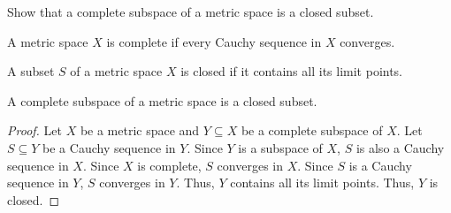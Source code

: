 \begin{problem}
  Show that a complete subspace of a metric space is a closed subset.
\end{problem}
\begin{answer}
  \begin{definition}
    A metric space $X$ is complete if every Cauchy sequence in $X$ converges.
  \end{definition}

  \begin{definition}
    A subset $S$ of a metric space $X$ is closed if it contains all its limit points.
  \end{definition}

  \begin{claim}
    A complete subspace of a metric space is a closed subset.
    \begin{proof}
      Let $X$ be a metric space and $Y \subseteq X$ be a complete subspace of $X$.
      Let $S \subseteq Y$ be a Cauchy sequence in $Y$.
      Since $Y$ is a subspace of $X$, $S$ is also a Cauchy sequence in $X$.
      Since $X$ is complete, $S$ converges in $X$.
      Since $S$ is a Cauchy sequence in $Y$, $S$ converges in $Y$.
      Thus, $Y$ contains all its limit points.
      Thus, $Y$ is closed.
    \end{proof}
  \end{claim}
\end{answer}

